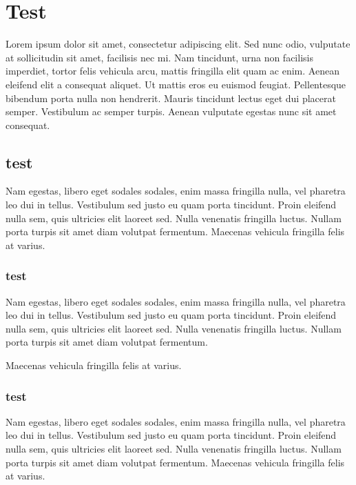 \chapter{Test}
{

    Lorem ipsum dolor sit amet, consectetur adipiscing elit.
    Sed nunc odio, vulputate at sollicitudin sit amet, facilisis nec mi.
    Nam tincidunt, urna non facilisis imperdiet, tortor felis vehicula arcu,
    mattis fringilla elit quam ac enim. Aenean eleifend elit a consequat aliquet.
    Ut mattis eros eu euismod feugiat. Pellentesque bibendum porta nulla non hendrerit.
    Mauris tincidunt lectus eget dui placerat semper. Vestibulum ac semper turpis.
    Aenean vulputate egestas nunc sit amet consequat.
    
    \section{test}
    {
        Nam egestas, libero eget sodales sodales, enim massa fringilla nulla, vel pharetra leo dui in tellus.
        Vestibulum sed justo eu quam porta tincidunt. Proin eleifend nulla sem,
        quis ultricies elit laoreet sed. Nulla venenatis fringilla luctus.
        Nullam porta turpis sit amet diam volutpat fermentum.
        Maecenas vehicula fringilla felis at varius.
    }

    \subsection{test}
    {
        Nam egestas, libero eget sodales sodales, enim massa fringilla nulla, vel pharetra leo dui in tellus.
        Vestibulum sed justo eu quam porta tincidunt. Proin eleifend nulla sem,
        quis ultricies elit laoreet sed. Nulla venenatis fringilla luctus.
        Nullam porta turpis sit amet diam volutpat fermentum.
        
        Maecenas vehicula fringilla felis at varius.
    }

    \subsection{test}
    {
        Nam egestas, libero eget sodales sodales, enim massa fringilla nulla, vel pharetra leo dui in tellus.
        Vestibulum sed justo eu quam porta tincidunt. Proin eleifend nulla sem,
        quis ultricies elit laoreet sed. Nulla venenatis fringilla luctus.
        Nullam porta turpis sit amet diam volutpat fermentum.
        Maecenas vehicula fringilla felis at varius.
    }
}